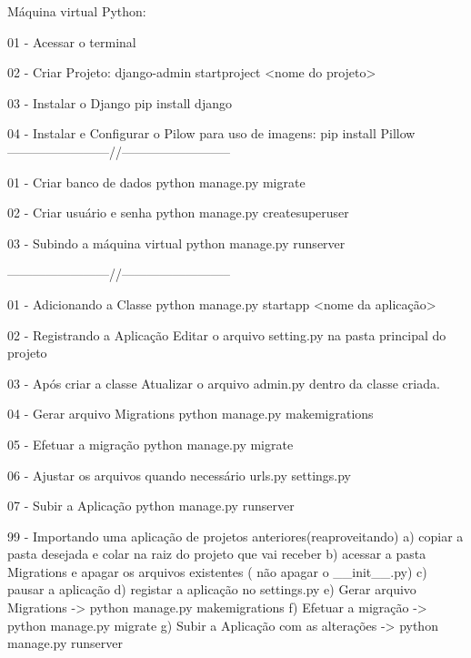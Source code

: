 Máquina virtual Python:

01 - Acessar o terminal

02 - Criar Projeto:
	django-admin startproject <nome do projeto>
	
03 - Instalar o Django	
	pip install django
	
04 - Instalar e Configurar o Pilow para uso de imagens:
	pip install Pillow	
------------------------//--------------------------
		
01 - Criar banco de dados
	python manage.py migrate
	
02 - Criar usuário e senha
	python manage.py createsuperuser	

03 - Subindo a máquina virtual
	python manage.py runserver
	
------------------------//--------------------------	

01 - Adicionando a Classe
	python manage.py startapp <nome da aplicação> 
	
02 - Registrando a Aplicação
	Editar o arquivo setting.py na pasta principal do projeto

03 - Após criar a classe 
	Atualizar o arquivo admin.py dentro da classe criada.

04 - Gerar arquivo Migrations
	python manage.py makemigrations
	
05 - Efetuar a migração
	python manage.py migrate
	
06 - Ajustar os arquivos quando necessário
	urls.py
	settings.py

07 - Subir a Aplicação
	python manage.py runserver	
	
99 - Importando uma aplicação de projetos anteriores(reaproveitando)
    a) copiar a pasta desejada e colar na raiz do projeto que vai receber
    b) acessar a pasta Migrations e apagar os arquivos existentes ( não apagar o __init__.py)
    c) pausar a aplicação
    d) registar a aplicação no settings.py
    e) Gerar arquivo Migrations -> python manage.py makemigrations 
    f) Efetuar a migração -> python manage.py migrate
	g) Subir a Aplicação com as alterações -> python manage.py runserver
    
    
	
	
	
